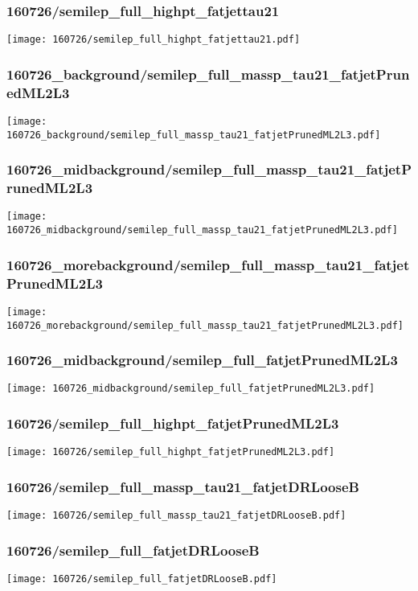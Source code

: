 \begin{frame}
   \frametitle{\small 160726/semilep\_full\_highpt\_fatjettau21}
   \centering
   \texttt{[image: 160726/semilep\_full\_highpt\_fatjettau21.pdf]}
\end{frame}

\begin{frame}
   \frametitle{\small 160726\_background/semilep\_full\_massp\_tau21\_fatjetPrunedML2L3}
   \centering
   \texttt{[image: 160726\_background/semilep\_full\_massp\_tau21\_fatjetPrunedML2L3.pdf]}
\end{frame}

\begin{frame}
   \frametitle{\small 160726\_midbackground/semilep\_full\_massp\_tau21\_fatjetPrunedML2L3}
   \centering
   \texttt{[image: 160726\_midbackground/semilep\_full\_massp\_tau21\_fatjetPrunedML2L3.pdf]}
\end{frame}

\begin{frame}
   \frametitle{\small 160726\_morebackground/semilep\_full\_massp\_tau21\_fatjetPrunedML2L3}
   \centering
   \texttt{[image: 160726\_morebackground/semilep\_full\_massp\_tau21\_fatjetPrunedML2L3.pdf]}
\end{frame}

\begin{frame}
   \frametitle{\small 160726\_midbackground/semilep\_full\_fatjetPrunedML2L3}
   \centering
   \texttt{[image: 160726\_midbackground/semilep\_full\_fatjetPrunedML2L3.pdf]}
\end{frame}

\begin{frame}
   \frametitle{\small 160726/semilep\_full\_highpt\_fatjetPrunedML2L3}
   \centering
   \texttt{[image: 160726/semilep\_full\_highpt\_fatjetPrunedML2L3.pdf]}
\end{frame}

\begin{frame}
   \frametitle{\small 160726/semilep\_full\_massp\_tau21\_fatjetDRLooseB}
   \centering
   \texttt{[image: 160726/semilep\_full\_massp\_tau21\_fatjetDRLooseB.pdf]}
\end{frame}

\begin{frame}
   \frametitle{\small 160726/semilep\_full\_fatjetDRLooseB}
   \centering
   \texttt{[image: 160726/semilep\_full\_fatjetDRLooseB.pdf]}
\end{frame}

